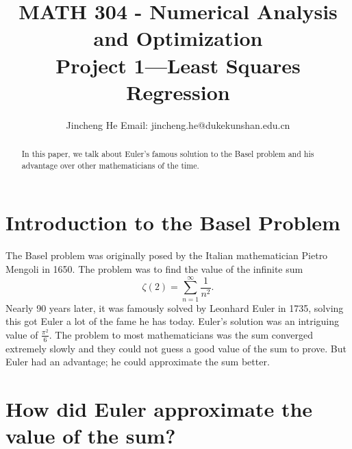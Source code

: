 \documentclass{article}
\title{MATH 304 - Numerical Analysis and Optimization \\ Project 1---Least Squares Regression}
\author{Jincheng He  Email: jincheng.he@dukekunshan.edu.cn}
\theoremstyle{remark}
\theoremstyle{definition}
\begin{document}
\maketitle
\begin{abstract}
    In this paper, we talk about Euler's famous solution to the Basel problem and his advantage over other mathematicians of the time.
\end{abstract}
\section{Introduction to the Basel Problem}
The Basel problem was originally posed by the Italian mathematician Pietro Mengoli in 1650. The problem was to find the value of the infinite sum
    \[\zeta(2)=\sum_{n=1}^{\infty}\frac{1}{n^2}.\]
Nearly 90 years later, it was famously solved by Leonhard Euler in 1735, solving this got Euler a lot of the fame he has today. Euler's solution was an intriguing value of  $\frac{\pi^2}{6}$. The problem to most mathematicians was the sum converged extremely slowly and they could not guess a good value of the sum to prove. But Euler had an advantage; he could approximate the sum better.
\section{How did Euler approximate the value of the sum?}
\end{document}
